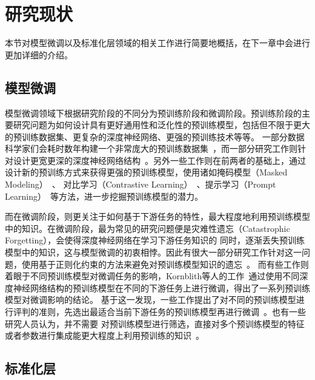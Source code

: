 \section{研究现状}

本节对模型微调以及标准化层领域的相关工作进行简要地概括，在下一章中会进行更加详细的介绍。

\subsection{模型微调}

模型微调领域下根据研究阶段的不同分为预训练阶段和微调阶段。预训练阶段的主要研究问题为如何设计具有更好通用性和泛化性的预训练模型，包括但不限于更大的预训练数据集、更复杂的深度神经网络、更强的预训练技术等等。
一部分数据科学家们会耗时数年构建一个非常庞大的预训练数据集~\citep{deng2009imagenet,sun2017revisiting}，而一部分研究工作则针对设计更宽更深的深度神经网络结构~\citep{szegedy_going_2015,szegedy2016rethinking,
he2016deep,huang_densely_2017}。另外一些工作则在前两者的基础上，通过设计新的预训练方式来获得更强的预训练模型，使用诸如掩码模型（Masked Modeling）~\citep{devlin2019bert,bao2021beit,he2021masked}、
对比学习（Contrastive Learning）~\citep{he2020momentum,chen_simple_2020}、提示学习（Prompt Learning）~\citep{liu2021pre,radford2021learning}等方法，进一步挖掘预训练模型的潜力。

而在微调阶段，则更关注于如何基于下游任务的特性，最大程度地利用预训练模型中的知识。在微调阶段，最为常见的研究问题便是灾难性遗忘（Catastrophic Forgetting），会使得深度神经网络在学习下游任务知识的
同时，逐渐丢失预训练模型中的知识，这与模型微调的初衷相悖。因此有很大一部分研究工作针对这一问题，使用基于正则化约束的方法来避免对预训练模型知识的遗忘~\citep{li2017learning,li2018delta,li2018learning,you2020co}。
而有些工作则着眼于不同预训练模型对微调任务的影响，Kornblith等人的工作~\citep{kornblith2018better}通过使用不同深度神经网络结构的预训练模型在不同的下游任务上进行微调，得出了一系列预训练模型对微调影响的结论。
基于这一发现，一些工作提出了对不同的预训练模型进行评判的准则，先选出最适合当前下游任务的预训练模型再进行微调~\citep{tran2019transferability,bao2019information,you2021logme}。也有一些研究人员认为，并不需要
对预训练模型进行筛选，直接对多个预训练模型的特征或者参数进行集成能更大程度上利用预训练的知识~\citep{rusu2016progressive,liu2019knowledge,shu2021zoo}。


\subsection{标准化层}

